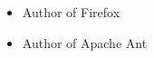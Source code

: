 \documentclass{article}
\newcommand*{\authorimg}[1]{%
  \raisebox{-.3\baselineskip}{%
    \texttt{[image: \#1]}%
  }%
}
\begin{document}
\begin{itemize}
\item[\authorimg{martin.png}] Author of Firefox
\item[\authorimg{martin.png}] Author of Apache Ant
\end{itemize}
\end{document}
